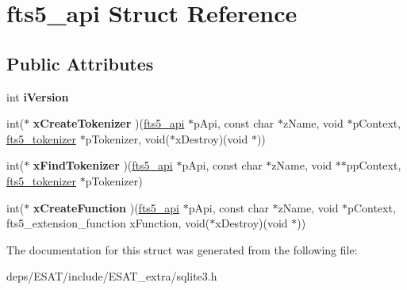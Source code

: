\hypertarget{structfts5__api}{}\section{fts5\+\_\+api Struct Reference}
\label{structfts5__api}
\subsection*{Public Attributes}
\begin{DoxyCompactItemize}
\item 
\mbox{\label{structfts5__api_a3c338289abb33e1805da870172956a7c}} 
int {\bfseries i\+Version}
\item 
\mbox{\label{structfts5__api_a7fe3663f85eab512d5c461e1674da129}} 
int($\ast$ {\bfseries x\+Create\+Tokenizer} )(\mbox{\hyperlink{structfts5__api}{fts5\+\_\+api}} $\ast$p\+Api, const char $\ast$z\+Name, void $\ast$p\+Context, \mbox{\hyperlink{structfts5__tokenizer}{fts5\+\_\+tokenizer}} $\ast$p\+Tokenizer, void($\ast$x\+Destroy)(void $\ast$))
\item 
\mbox{\label{structfts5__api_a20a23794695fa61e2892ad1243b16b67}} 
int($\ast$ {\bfseries x\+Find\+Tokenizer} )(\mbox{\hyperlink{structfts5__api}{fts5\+\_\+api}} $\ast$p\+Api, const char $\ast$z\+Name, void $\ast$$\ast$pp\+Context, \mbox{\hyperlink{structfts5__tokenizer}{fts5\+\_\+tokenizer}} $\ast$p\+Tokenizer)
\item 
\mbox{\label{structfts5__api_acf1a0612be3b91b908f38ecbc6735d17}} 
int($\ast$ {\bfseries x\+Create\+Function} )(\mbox{\hyperlink{structfts5__api}{fts5\+\_\+api}} $\ast$p\+Api, const char $\ast$z\+Name, void $\ast$p\+Context, fts5\+\_\+extension\+\_\+function x\+Function, void($\ast$x\+Destroy)(void $\ast$))
\end{DoxyCompactItemize}


The documentation for this struct was generated from the following file\+:\begin{DoxyCompactItemize}
\item 
deps/\+E\+S\+A\+T/include/\+E\+S\+A\+T\+\_\+extra/sqlite3.\+h\end{DoxyCompactItemize}
